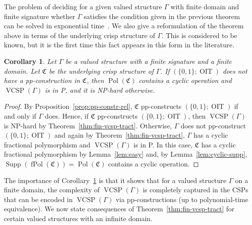\documentclass[nonacm]{acmart}
\newcommand{\bC}{{\mathfrak C}}
\DeclareMathOperator{\fPol}{fPol}
\DeclareMathOperator{\VCSP}{VCSP}
\DeclareMathOperator{\Pol}{Pol}
\DeclareMathOperator{\Sup}{Supp}
\DeclareMathOperator{\OIT}{OIT}
\newtheorem{corollary}[theorem]{Corollary}
\begin{document}
The problem of deciding for a given valued structure $\Gamma$ with finite domain and finite signature whether $\Gamma$ satisfies the condition given in the previous theorem can be solved in exponential time~\cite{Kolmogorov-Meta}. 
We also give a reformulation of the theorem above in terms of the underlying crisp structure of $\Gamma$. This is considered to be known, but it is the first time this fact appears in this form in the literature. 

\begin{corollary}\label{cor:underl-crisp}
Let $\Gamma$ be a valued structure with a finite signature and a finite domain. Let $\bC$ be the underlying crisp structure of $\Gamma$. If $(\{0,1\};\OIT)$ does not have a pp-construction in $\bC$, then $\Pol(\bC)$ contains a cyclic operation
and $\VCSP(\Gamma)$ is in P, and it is NP-hard otherwise. 
\end{corollary}

\begin{proof}
By Proposition~\ref{prop:pp-constr-rel}, $\bC$ pp-constructs $(\{0,1\};\OIT)$ if and only if $\Gamma$ does. Hence, if $\bC$ pp-constructs $(\{0,1\};\OIT)$, then $\VCSP(\Gamma)$ is NP-hard by Theorem~\ref{thm:fin-vcsp-tract}. Otherwise, $\Gamma$ does not pp-construct $(\{0,1\};\OIT)$ and again by Theorem~\ref{thm:fin-vcsp-tract}, $\Gamma$ has a cyclic fractional polymorphism and $\VCSP(\Gamma)$ is in P. In this case, $\bC$ has a cyclic fractional polymorphism by Lemma~\ref{lem:easy} and, by Lemma~\ref{lem:cyclic-supp}, $\Sup(\fPol(\bC)) = \Pol(\bC)$ contains a cyclic operation.
\end{proof}

The importance of Corollary~\ref{cor:underl-crisp} is that it shows that for a valued structure $\Gamma$ on a finite domain, the complexity of $\VCSP(\Gamma)$ is completely captured in the CSPs that can be encoded in $\VCSP(\Gamma)$ via pp-constructions (up to polynomial-time equivalence). 
We now state consequences of Theorem~\ref{thm:fin-vcsp-tract} for certain valued structures with an infinite domain.
\end{document}
